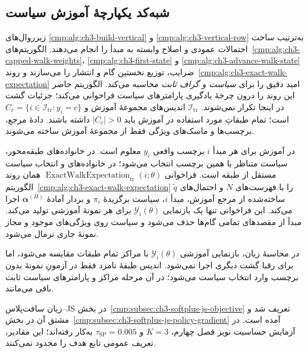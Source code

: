 \subsection{شبه‌کد یکپارچهٔ آموزش سیاست}
\label{cmp:subsec:ch3-policy-training-pseudocode}
زیرروال‌های
\ref{cmp:alg:ch3-build-vertical} و
\ref{cmp:alg:ch3-vertical-row}
به‌ترتیب ساخت احتمالات عمودی و اصلاح
وابسته به مبدأ را انجام می‌دهند.
الگوریتم‌های~\ref{cmp:alg:ch3-capped-walk-weights}،
\ref{cmp:alg:ch3-first-state} و
\ref{cmp:alg:ch3-advance-walk-state}
ضرایب، توزیع نخستین گام و انتشار را می‌سازند
و روند~\ref{cmp:alg:ch3-exact-walk-expectation}
امید دقیق را برای \emph{سیاست و گراف ثابت}
محاسبه می‌کند. الگوریتم حاضر این روند را
درون چرخهٔ یادگیری پارامترهای سیاست فراخوانی
می‌کند؛ جزئیات گشت در اینجا تکرار نمی‌شوند.
$\mathcal I_{\mathrm{tr}}$ اندیس‌های مجموعهٔ آموزش و
$C_c=\{i\in\mathcal I_{\mathrm{tr}}:y_i=c\}$ است؛
تمام طبقاتِ مورد استفاده در آموزش باید $|C_c|>0$
داشته باشند. دادهٔ مرجع، برچسب‌ها و ماسک‌های
ویژگی فقط از مجموعهٔ آموزش ساخته می‌شوند.

در آموزش برای هر مبدأ $i$ برچسب واقعی $y_i$
معلوم است. در خانواده‌های طبقه‌محور،
سیاست متناظر با همین برچسب انتخاب می‌شود؛
در خانواده‌های  و 
انتخاب سیاست مستقل از طبقه است.
فراخوانی
$\operatorname{ExactWalkExpectation}_{\mathrm{tr}}(i;\theta)$
همان روند
الگوریتم~\ref{cmp:alg:ch3-exact-walk-expectation}
را با فهرست‌های $N$ و احتمال‌های
$\widetilde q$ ساخته‌شده از مرجع آموزش،
مبدأ $i$، سیاست برگزیدهٔ $\pi_i$
و بردار آمادهٔ $\boldsymbol\alpha^{(H)}$
اجرا می‌کند. این فراخوانی تنها یک
بازنمایی $\mathscr Y_i(\theta)$
برای هر نمونهٔ آموزشی تولید می‌کند.
مبدأ از مقصدهای تمامی گام‌ها حذف می‌شود
و سیاست روی ویژگی‌های موجود و مجاز
نمونهٔ جاری نرمال می‌شود.

در محاسبهٔ زیان، بازنمایی آموزشی
$\mathscr Y_i(\theta)$ با مراکز تمام
طبقات مقایسه می‌شود، اما برای رقبا
گشت دیگری اجرا نمی‌شود. اندیس طبقهٔ
نامزد فقط در آزمونِ نمونهٔ بدون
برچسب وارد انتخاب سیاست می‌شود؛
در آن مرحله مراکز و پارامترهای
سیاست ثابت باقی می‌مانند.

زیان سافت‌پلاس--JS در بخش~\ref{cmp:subsec:ch3-softplus-js-objective}
تعریف شد و مشتق آن در بخش~\ref{cmp:subsec:ch3-softplus-js-policy-gradient}
آمده است. در آزمایش حساسیت نویز فصل چهارم،
$K=3$ و $\tau_{\mathrm{SP}}=0.005$ به‌کار رفته‌اند؛
این مقادیر، تعریف عمومی تابع هدف را محدود نمی‌کنند.

